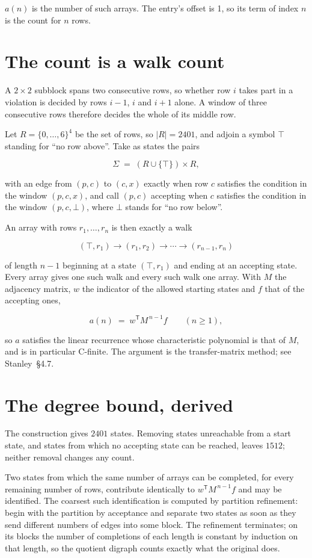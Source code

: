 \documentclass[11pt]{article}
\theoremstyle{definition}
\begin{document}
$a(n)$ is the number of such arrays. The entry's offset is 1, so its term of index $n$ is the count for $n$ rows.

\section{The count is a walk count}

A $2 \times 2$ subblock spans two consecutive rows, so whether row $i$ takes part in a violation is decided by rows $i-1$, $i$ and $i+1$ alone. A window of three consecutive rows therefore decides the whole of its middle row.

Let $R = \{0,\dots,6\}^{4}$ be the set of rows, so $|R| = 2401$, and adjoin a symbol $\top$ standing for ``no row above''. Take as states the pairs

\[\Sigma \;=\; (R \cup \{\top\}) \times R,\]

with an edge from $(p,c)$ to $(c,x)$ exactly when row $c$ satisfies the condition in the window $(p,c,x)$, and call $(p,c)$ accepting when $c$ satisfies the condition in the window $(p,c,\bot)$, where $\bot$ stands for ``no row below''.

An array with rows $r_1,\dots,r_n$ is then exactly a walk

\[(\top,r_1) \to (r_1,r_2) \to \cdots \to (r_{n-1},r_n)\]

of length $n-1$ beginning at a state $(\top,r_1)$ and ending at an accepting state. Every array gives one such walk and every such walk one array. With $M$ the adjacency matrix, $w$ the indicator of the allowed starting states and $f$ that of the accepting ones,

\[a(n) \;=\; w^{\mathsf T} M^{\,n-1} f \qquad (n \ge 1),\]

so $a$ satisfies the linear recurrence whose characteristic polynomial is that of $M$, and is in particular C-finite. The argument is the transfer-matrix method; see Stanley~\S4.7.

\section{The degree bound, derived}

The construction gives $2401$ states. Removing states unreachable from a start state, and states from which no accepting state can be reached, leaves $1512$; neither removal changes any count.

Two states from which the same number of arrays can be completed, for every remaining number of rows, contribute identically to $w^{\mathsf T}M^{\,n-1}f$ and may be identified. The coarsest such identification is computed by partition refinement: begin with the partition by acceptance and separate two states as soon as they send different numbers of edges into some block. The refinement terminates; on its blocks the number of completions of each length is constant by induction on that length, so the quotient digraph counts exactly what the original does.
\end{document}
